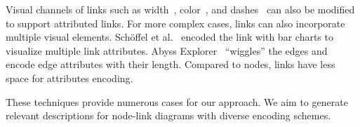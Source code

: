 Visual channels of links such as width~\cite{Katz_2015}, color~\cite{DBLP:journals/tvcg/Guo09}, and dashes~\cite{DBLP:journals/bmcbi/JunkerKS06} can also be modified to support attributed links.
For more complex cases, links can also incorporate multiple visual elements.
Sch{\"{o}}ffel et al.~\cite{DBLP:conf/iv/SchoffelSE16} encoded the link with bar charts to visualize multiple link attributes.
Abyss Explorer~\cite{DBLP:journals/tvcg/NielsenJBJ09} ``wiggles'' the edges and encode edge attributes with their length.
Compared to nodes, links have less space for attributes encoding.

These techniques provide numerous cases for our approach.
We aim to generate relevant descriptions for node-link diagrams with diverse encoding schemes.

